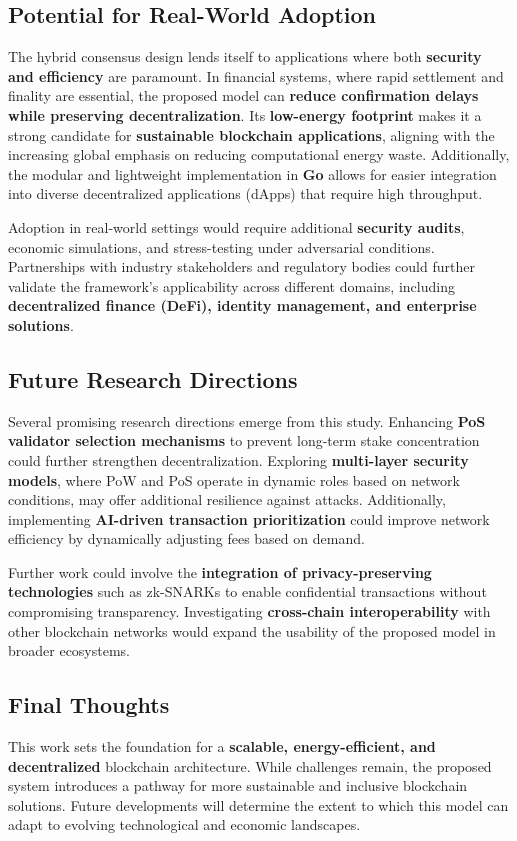 \documentclass[conference]{IEEEtran}
\begin{document}
\subsection{Potential for Real-World Adoption}
The hybrid consensus design lends itself to applications where both \textbf{security and efficiency} are paramount. In financial systems, where rapid settlement and finality are essential, the proposed model can \textbf{reduce confirmation delays while preserving decentralization}. Its \textbf{low-energy footprint} makes it a strong candidate for \textbf{sustainable blockchain applications}, aligning with the increasing global emphasis on reducing computational energy waste. Additionally, the modular and lightweight implementation in \textbf{Go} allows for easier integration into diverse decentralized applications (dApps) that require high throughput.

Adoption in real-world settings would require additional \textbf{security audits}, economic simulations, and stress-testing under adversarial conditions. Partnerships with industry stakeholders and regulatory bodies could further validate the framework’s applicability across different domains, including \textbf{decentralized finance (DeFi), identity management, and enterprise solutions}.

\subsection{Future Research Directions}
Several promising research directions emerge from this study. Enhancing \textbf{PoS validator selection mechanisms} to prevent long-term stake concentration could further strengthen decentralization. Exploring \textbf{multi-layer security models}, where PoW and PoS operate in dynamic roles based on network conditions, may offer additional resilience against attacks. Additionally, implementing \textbf{AI-driven transaction prioritization} could improve network efficiency by dynamically adjusting fees based on demand.

Further work could involve the \textbf{integration of privacy-preserving technologies} such as zk-SNARKs to enable confidential transactions without compromising transparency. Investigating \textbf{cross-chain interoperability} with other blockchain networks would expand the usability of the proposed model in broader ecosystems.

\subsection{Final Thoughts}
This work sets the foundation for a \textbf{scalable, energy-efficient, and decentralized} blockchain architecture. While challenges remain, the proposed system introduces a pathway for more sustainable and inclusive blockchain solutions. Future developments will determine the extent to which this model can adapt to evolving technological and economic landscapes.
\end{document}
